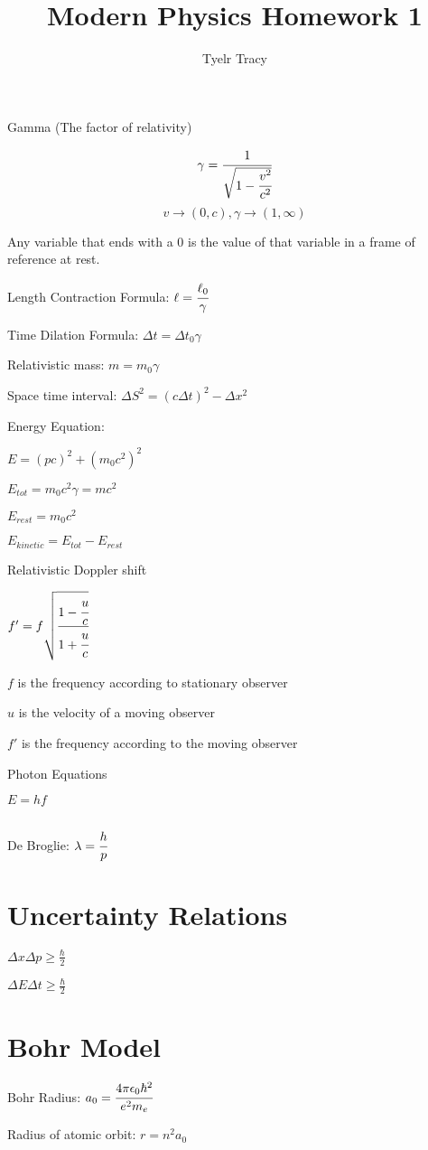 \documentclass{article}
\title{Modern Physics Homework 1}
\author{Tyelr Tracy}
\begin{document}
Gamma (The factor of relativity)

$$ \gamma = \cfrac{1}{\sqrt{1 - \cfrac{v^2}{c^2}}} $$
$$ v \rightarrow (0, c), \gamma \rightarrow (1, \infty) $$

Any variable that ends with a 0 is the value of that variable in a frame of reference at rest.


Length Contraction Formula: $\ell = \cfrac{\ell_0}{\gamma}$

Time Dilation Formula: $\Delta t = \Delta t_0 \gamma$

Relativistic mass: $m = m_0 \gamma$

Space time interval: $\Delta S^2 =  (c \Delta t)^2 - \Delta x^2 $


Energy Equation:

$E = (pc)^2 + (m_0c^2)^2$

$E_{tot} = m_0c^2\gamma = mc^2$

$E_{rest} = m_0c^2$

$E_{kinetic} = E_{tot} - E_{rest}$



Relativistic Doppler shift

$f' = f \sqrt{\cfrac{1- \cfrac{u}{c}}{1 + \cfrac{u}{c}}}$

\hspace*{10mm} $f$ is the frequency according to stationary observer

\hspace*{10mm} $u$ is the velocity of a moving observer

\hspace*{10mm} $f'$ is the frequency according to the moving observer


Photon Equations

$ E = hf $

$  $


De Broglie: $ \lambda = \cfrac{h}{p} $


\section*{Uncertainty Relations}

$\Delta x \Delta p \geq \frac{\hbar}{2}$

$\Delta E \Delta t \geq \frac{\hbar}{2}$


\section*{Bohr Model}


Bohr Radius: 
$a_0 = \cfrac{4\pi\epsilon_0\hbar^2}{e^2m_e}$


Radius of atomic orbit: $r = n^2 a_0$
\end{document}
